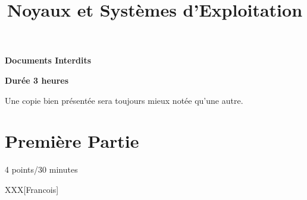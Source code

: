%
%
%
%
%
%

%
%

%
%

\def\path{../../..}

%
%



%
%

\title{Noyaux et Syst\`emes d'Exploitation}

%
%


%
%



%
%

\maketitle

%
%

\indentation{}

%
%

\begin{center}

\textbf{Documents Interdits}

\textbf{Dur\'ee 3 heures}

\scriptsize{Une copie bien pr\'esent\'ee sera toujours mieux not\'ee
            qu'une autre.}

\end{center}

%
%

%
%

\section{Premi\`ere Partie}
{\hfill{} \scriptsize{4 points/30 minutes}}

XXX[Francois]

